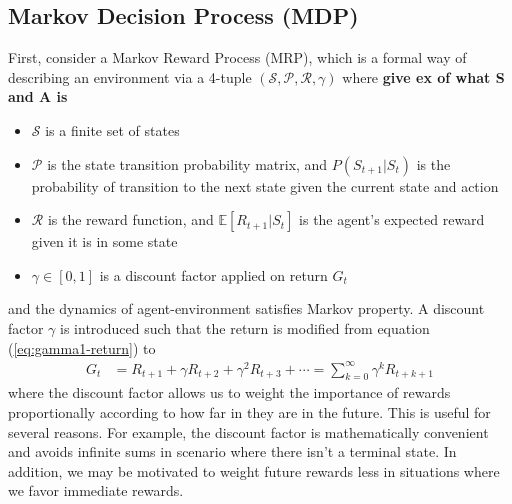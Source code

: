 \documentclass[12pt]{report}
\begin{document}
\subsection{Markov Decision Process (MDP)}

First, consider a Markov Reward Process (MRP), which is a formal way of describing an environment via a 4-tuple $(\mathcal{S},\mathcal{P},\mathcal{R},\gamma)$ where
\textbf{give ex of what S and A is}
\begin{itemize}
    \item $\mathcal{S}$ is a finite set of states
    \item $\mathcal{P}$ is the state transition probability matrix, and $P(S_{t+1}|S_t)$ is the probability of transition to the next state given the current state and action
    \item $\mathcal{R}$ is the reward function, and $\mathbb{E}[R_{t+1}|S_t]$ is the agent's expected reward given it is in some state
    \item $\gamma \in [0,1]$ is a discount factor applied on return $G_t$
\end{itemize}
and the dynamics of agent-environment satisfies Markov property. A discount factor $\gamma$ is introduced such that the return is modified from equation (\ref{eq:gamma1-return}) to
\begin{align}
    G_t &= R_{t+1} + \gamma R_{t+2} + \gamma^2 R_{t+3} + \cdots = \sum_{k=0}^\infty \gamma^k R_{t+k+1} \label{eq:discounted-return}
\end{align}
where the discount factor allows us to weight the importance of rewards proportionally according to how far in they are in the future. This is useful for several reasons. For example, the discount factor is mathematically convenient and avoids infinite sums in scenario where there isn't a terminal state. In addition, we may be motivated to weight future rewards less in situations where we favor immediate rewards.\\
\end{document}
